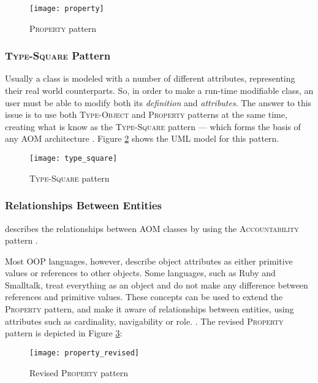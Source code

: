 \begin{figure}[H]
  \centering
  \texttt{[image: property]}
  \caption{\textsc{Property} pattern}
  \label{fig:property_pattern}
\end{figure}

\subsubsection{\textsc{Type-Square} Pattern}\label{sec:type-square_pattern}

Usually a class is modeled with a number of different attributes, representing their real world counterparts. So, in order to make a run-time modifiable class, an user must be able to modify both its \emph{definition} and \emph{attributes}. The answer to this issue is to use both \textsc{Type-Object} and \textsc{Property} patterns at the same time, creating what is know as the \textsc{Type-Square} pattern --- which forms the basis of any AOM architecture \cite{YJ02}. Figure \ref{fig:type_square} shows the UML model for this pattern.

\begin{figure}[H]
  \centering
  \texttt{[image: type\_square]}
  \caption{\textsc{Type-Square} pattern}
  \label{fig:type_square}
\end{figure}

\subsubsection{Relationships Between Entities}\label{sec:relationships_between_entities}

\cite{YJ02} describes the relationships between AOM classes by using the \textsc{Accountability} pattern \cite{fowler, hay}.

Most OOP languages, however, describe object attributes as either primitive values or references to other objects. Some languages, such as Ruby and Smalltalk, treat everything as an object and do not make any difference between references and primitive values. These concepts can be used to extend the \textsc{Property} pattern, and make it aware of relationships between entities, using attributes such as cardinality, navigability or role. \cite{aom_research_roadmap}. The revised \textsc{Property} pattern is depicted in Figure \ref{fig:property_revised}:

\begin{figure}[H]
  \centering
  \texttt{[image: property\_revised]}
  \caption{Revised \textsc{Property} pattern}
  \label{fig:property_revised}
\end{figure}

